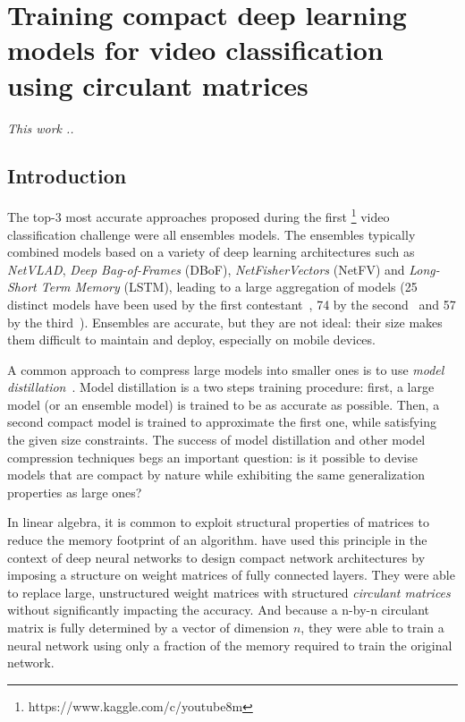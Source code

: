 \chapter{Training compact deep learning models for video classification using circulant matrices}
\label{chapter:training_compact_deep_learning_models_for_video_classification_using_circulant_matrices}
\localtableofcontents

\emph{This work ..}



\section{Introduction}
\label{section:ap2-intro}

The top-3 most accurate approaches proposed during the first \yt\footnote{https://www.kaggle.com/c/youtube8m} video classification challenge  were all ensembles models.
The ensembles typically combined models based on a variety of deep learning architectures such as \emph{NetVLAD}, \emph{Deep Bag-of-Frames} (DBoF), \emph{NetFisherVectors} (NetFV) and \emph{Long-Short Term Memory} (LSTM), leading to a large aggregation of models (25 distinct models have been used by the first contestant~\cite{miech2017learnable}, 74 by the second~\cite{DBLP:journals/corr/WangZW17} and 57 by the third~\cite{DBLP:journals/corr/LiGLBLLLZW17}).
Ensembles are accurate, but they are not ideal: their size makes them difficult to maintain and deploy, especially on mobile devices. 

A common approach to compress large models into smaller ones is to use \emph{model distillation}~\cite{44873}.
Model distillation is a two steps training procedure: first, a large model (or an ensemble model) is trained to be as accurate as possible.
Then, a second compact model is trained to approximate the first one, while satisfying the given size constraints.
The success of model distillation and other model compression techniques begs an important question: is it possible to devise models that are compact by nature while exhibiting the same generalization properties as large ones?

In linear algebra, it is common to exploit structural properties of matrices to reduce the memory footprint of an algorithm. 
\citet{cheng} have used this principle in the context of deep neural networks to design compact network architectures by imposing a structure on weight matrices of fully connected layers.
They were able to replace large, unstructured weight matrices with structured \emph{circulant matrices} without significantly impacting the accuracy.
And because a n-by-n circulant matrix is fully determined by a vector of dimension $n$, they were able to train a neural network using only a fraction of the memory required to train the original network.

